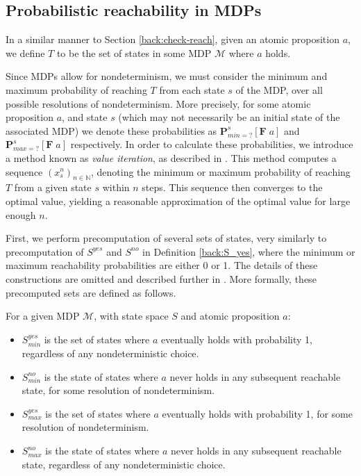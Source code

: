 \subsection{Probabilistic reachability in MDPs}
\label{cs1:prob_reach_mdps}

In a similar manner to Section \ref{back:check-reach}, given an atomic proposition $a$, we define $T$ to be the set of states in some MDP $\mathcal{M}$ where $a$ holds.

Since MDPs allow for nondeterminism, we must consider the minimum and maximum probability of reaching $T$ from each state $s$ of the MDP, over all possible resolutions of nondeterminism. More precisely, for some atomic proposition $a$, and state $s$ (which may not necessarily be an initial state of the associated MDP) we denote these probabilities as $\mathbf{P}^{s}_{min=?} [\mathbf{F} \; a]$ and $\mathbf{P}^{s}_{max=?} [\mathbf{F} \; a]$ respectively. In order to calculate these probabilities, we introduce a method known as \emph{value iteration}, as described in \cite{chatterjee_value_2008}. This method computes a sequence $(x^n_s)_{n \in \mathbb{N}}$, denoting the minimum or maximum probability of reaching $T$ from a given state $s$ within $n$ steps. This sequence then converges to the optimal value, yielding a reasonable approximation of the optimal value for large enough $n$.

First, we perform precomputation of several sets of states, very similarly to precomputation of $S^{yes}$ and $S^{no}$ in Definition \ref{back:S_yes}, where the minimum or maximum reachability probabilities are either 0 or 1. The details of these constructions are omitted and described further in \cite{forejt_automated_2011}. More formally, these precomputed sets are defined as follows.

\begin{definition}
\label{cs1:yes_no}

For a given MDP $\mathcal{M}$, with state space $S$ and atomic proposition $a$:

\begin{itemize}
    \item $S^{yes}_{min}$ is the set of states where $a$ eventually holds with probability 1, regardless of any nondeterministic choice.
    \item $S^{no}_{min}$ is the state of states where $a$ never holds in any subsequent reachable state, for some resolution of nondeterminism.
    \item $S^{yes}_{max}$ is the set of states where $a$ eventually holds with probability 1, for some resolution of nondeterminism.
    \item $S^{no}_{max}$ is the state of states where $a$ never holds in any subsequent reachable state, regardless of any nondeterministic choice.  
\end{itemize}
\end{definition}

